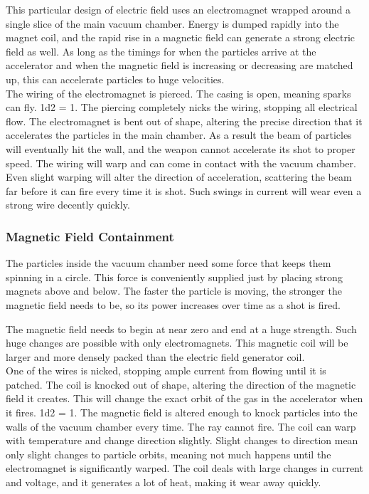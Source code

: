 \documentclass[a4paper]{article}
\begin{document}
This particular design of electric field uses an electromagnet wrapped around a single slice of the main vacuum chamber. Energy is dumped rapidly into the magnet coil, and the rapid rise in a magnetic field can generate a strong electric field as well. As long as the timings for when the particles arrive at the accelerator and when the magnetic field is increasing or decreasing are matched up, this can accelerate particles to huge velocities.
\\ \pbhw
{The wiring of the electromagnet is pierced. The casing is open, meaning sparks can fly. \newline 1d2 = 1. The piercing completely nicks the wiring, stopping all electrical flow.}
{The electromagnet is bent out of shape, altering the precise direction that it accelerates the particles in the main chamber. As a result the beam of particles will eventually hit the wall, and the weapon cannot accelerate its shot to proper speed.}
{The wiring will warp and can come in contact with the vacuum chamber. Even slight warping will alter the direction of acceleration, scattering the beam far before it can fire every time it is shot.}
{Such swings in current will wear even a strong wire decently quickly.}


\vspace{-0.5cm} \hspace{-18pt} \subsubsection{Magnetic Field Containment} \label{ray_containment} \vspace{-0.2cm}
The particles inside the vacuum chamber need some force that keeps them spinning in a circle. This force is conveniently supplied just by placing strong magnets above and below. The faster the particle is moving, the stronger the magnetic field needs to be, so its power increases over time as a shot is fired.

The magnetic field needs to begin at near zero and end at a huge strength. Such huge changes are possible with only electromagnets. This magnetic coil will be larger and more densely packed than the electric field generator coil. 
\\ \pbhw
{One of the wires is nicked, stopping ample current from flowing until it is patched.}
{The coil is knocked out of shape, altering the direction of the magnetic field it creates. This will change the exact orbit of the gas in the accelerator when it fires. \newline 1d2 = 1. The magnetic field is altered enough to knock particles into the walls of the vacuum chamber every time. The ray cannot fire.}
{The coil can warp with temperature and change direction slightly. Slight changes to direction mean only slight changes to particle orbits, meaning not much happens until the electromagnet is significantly warped.}
{The coil deals with large changes in current and voltage, and it generates a lot of heat, making it wear away quickly.}
\end{document}
